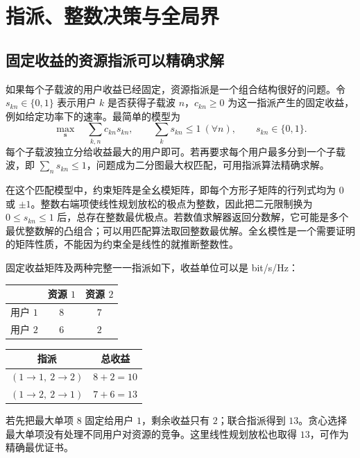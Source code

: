 \chapter{指派、整数决策与全局界}
\label{ch:discrete}

\section{固定收益的资源指派可以精确求解}

如果每个子载波的用户收益已经固定，资源指派是一个组合结构很好的问题。令 $s_{kn}\in\{0,1\}$ 表示用户 $k$ 是否获得子载波 $n$，$c_{kn}\geq0$ 为这一指派产生的固定收益，例如给定功率下的速率。最简单的模型为
\begin{equation}
 \max_{\bm s}\quad \sum_{k,n}c_{kn}s_{kn},\qquad
 \sum_ks_{kn}\leq1\ (\forall n),\qquad s_{kn}\in\{0,1\}.
 \label{eq:simple-assignment}
\end{equation}
每个子载波独立分给收益最大的用户即可。若再要求每个用户最多分到一个子载波，即 $\sum_ns_{kn}\leq1$，问题成为二分图最大权匹配，可用指派算法精确求解。

在这个匹配模型中，约束矩阵是全幺模矩阵，即每个方形子矩阵的行列式均为 $0$ 或 $\pm1$。整数右端项使线性规划放松的极点为整数，因此把二元限制换为 $0\leq s_{kn}\leq1$ 后，总存在整数最优极点。若数值求解器返回分数解，它可能是多个最优整数解的凸组合；可以用匹配算法取回整数最优解。全幺模性是一个需要证明的矩阵性质，不能因为约束全是线性的就推断整数性。

\begin{example}
固定收益矩阵及两种完整一一指派如下，收益单位可以是 bit/s/Hz：
\begin{center}
\begin{tabular}{c|cc}
\toprule
 & 资源 $1$ & 资源 $2$\\
\midrule
用户 $1$ & $8$ & $7$\\
用户 $2$ & $6$ & $2$\\
\bottomrule
\end{tabular}
\qquad
\begin{tabular}{c|c}
\toprule
指派 & 总收益\\
\midrule
$(1\to1,\ 2\to2)$ & $8+2=10$\\
$(1\to2,\ 2\to1)$ & $7+6=13$\\
\bottomrule
\end{tabular}
\end{center}
若先把最大单项 $8$ 固定给用户 $1$，剩余收益只有 $2$；联合指派得到 $13$。贪心选择最大单项没有处理不同用户对资源的竞争。这里线性规划放松也取得 $13$，可作为精确最优证书。
\end{example}


